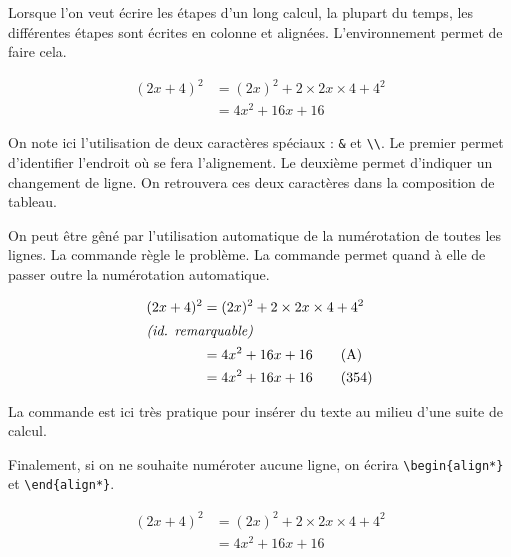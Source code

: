 Lorsque l'on veut écrire les étapes d'un long calcul, la plupart du temps, les différentes étapes sont écrites en colonne et alignées. L'environnement  permet de faire cela.\bigskip

{\NewFont
\begin{SideBySideExample}
    \begin{align}
        (2x + 4)^2 &= (2x)^2 + 2\times 2x\times 4 + 4^2 \\
                   &= 4x^2 + 16x + 16
    \end{align}
\end{SideBySideExample}
}\bigskip

On note ici l'utilisation de deux caractères spéciaux : \verb!&! et \verb!\\!. Le premier permet d'identifier l'endroit où se fera l'alignement. Le deuxième permet d'indiquer un changement de ligne. On retrouvera ces deux caractères dans la composition de tableau.

On peut être gêné par l'utilisation automatique de la numérotation de toutes les lignes. La commande  règle le problème. La commande  permet quand à elle de passer outre la numérotation automatique.\bigskip

{\NewFont
\begin{SideBySideExample}
    \begin{align}
        (2x + 4)^2 &= (2x)^2 + 2\times 2x\times 4
                                    + 4^2 \nonumber\\
        \shortintertext{\textit{(id. remarquable)}}
                   &= 4x^2 + 16x + 16 \tag{A} \\
                   &= 4x^2 + 16x + 16 \tag{354}
    \end{align}
\end{SideBySideExample}
}\bigskip

\begin{info}
    La commande  est ici très pratique pour insérer du texte au milieu d'une suite de calcul.
\end{info}

Finalement, si on ne souhaite numéroter aucune ligne, on écrira \verb!\begin{align*}! et \verb!\end{align*}!.\bigskip

{\NewFont
\begin{SideBySideExample}
    \begin{align*}
        (2x + 4)^2 &= (2x)^2 + 2\times 2x\times 4 + 4^2 \\
                   &= 4x^2 + 16x + 16
    \end{align*}
\end{SideBySideExample}
}\bigskip

